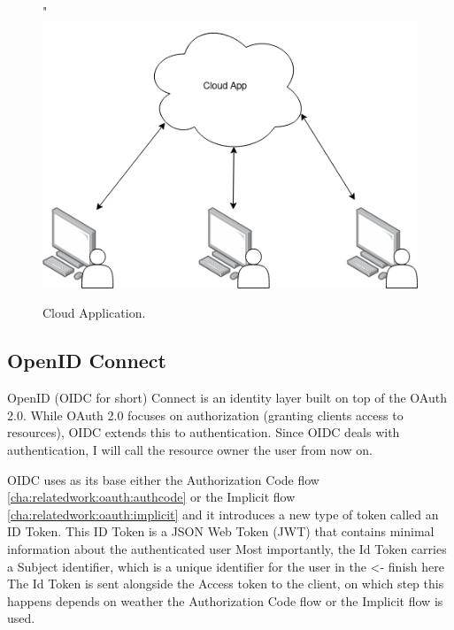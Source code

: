 \begin{figure}[H]
    \centering"
    \includegraphics[scale=0.4]{images/basic-cloud-services.drawio.png}
    \caption{Cloud Application.}
    \label{fig:oauth:authcodeflow}
\end{figure}

\subsection{OpenID Connect}
\label{cha:relatedwork:openid}


OpenID (OIDC for short) Connect is an identity layer built on top of the OAuth 2.0.
While OAuth 2.0 focuses on authorization (granting clients access to resources),
OIDC extends this to authentication.
Since OIDC deals with authentication, I will call the resource owner the user from now on.

OIDC uses as its base either the Authorization Code flow
\ref{cha:relatedwork:oauth:authcode} or the Implicit flow
\ref{cha:relatedwork:oauth:implicit} and
it introduces a new type of token called an ID Token.
This ID Token is a JSON Web Token (JWT) that contains minimal information about the authenticated
user
Most importantly, the Id Token carries a Subject identifier, which is a unique identifier
for the user in the <- finish here 
The Id Token is sent alongside the Access token to the client, on which step this happens
depends on weather the Authorization Code flow or the Implicit flow is used.


